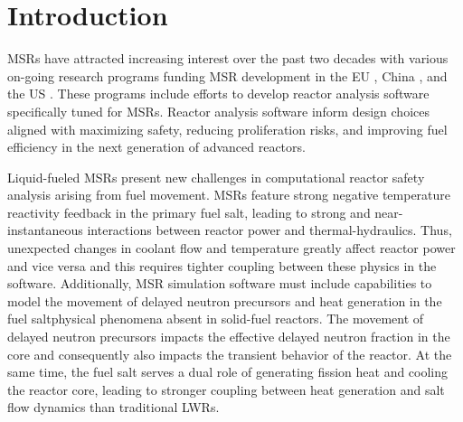 \section{Introduction} \label{sec:intro}

\glspl{MSR} have attracted increasing interest over the past two
decades with various on-going research programs funding \gls{MSR} development
in the EU \cite{cordis_severe_nodate}, China \cite{dai_17_2017}, and the US
\cite{doe_office_2021}. These programs include efforts to develop
reactor analysis software specifically tuned for \glspl{MSR}. Reactor
analysis software inform design choices aligned with
maximizing safety, reducing proliferation risks, and improving fuel
efficiency in the next generation of advanced reactors.

Liquid-fueled \glspl{MSR} present new challenges in computational reactor
safety analysis arising from fuel movement. \glspl{MSR} feature strong
negative temperature reactivity feedback in the primary fuel salt, leading to
strong and near-instantaneous
interactions between reactor power and thermal-hydraulics. Thus,
unexpected changes in coolant flow and temperature greatly affect reactor
power and vice versa and this requires tighter coupling between these physics
in the software. Additionally, \gls{MSR} simulation software must include
capabilities to model the movement of delayed neutron precursors
and heat generation in the fuel salt\textemdash physical phenomena
absent in solid-fuel reactors. The movement of delayed neutron precursors
impacts the effective delayed neutron fraction in the core and consequently
also impacts the transient behavior of the reactor. At the same time, the fuel
salt serves a dual role of generating fission heat and cooling the reactor
core, leading to stronger coupling between heat generation and salt flow
dynamics than traditional \glspl{LWR}.

